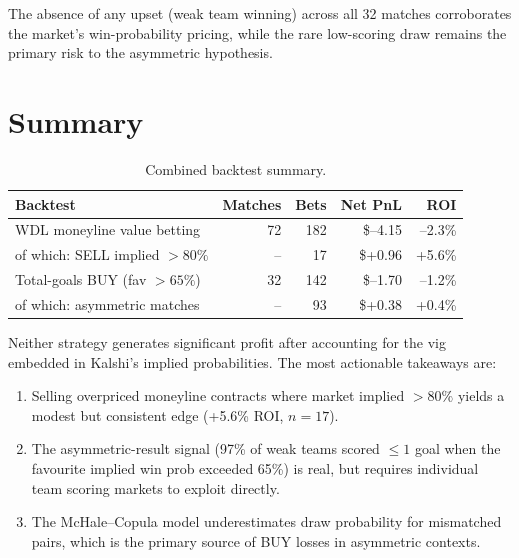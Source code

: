 \documentclass[11pt, a4paper]{article}
\begin{document}
The absence of any upset (weak team winning) across all 32 matches
corroborates the market's win-probability pricing, while the rare
low-scoring draw remains the primary risk to the asymmetric hypothesis.

\bigskip

\section{Summary}

\begin{table}[h!]
\centering
\caption{Combined backtest summary.}
\begin{tabular}{lrrrr}
\toprule
Backtest & Matches & Bets & Net PnL & ROI \\
\midrule
WDL moneyline value betting    & 72 & 182 & \$--4.15 & --2.3\% \\
\quad of which: SELL implied $>80\%$ & -- & 17 & \$+0.96 & +5.6\% \\
Total-goals BUY (fav $>65\%$) & 32 & 142 & \$--1.70 & --1.2\% \\
\quad of which: asymmetric matches & -- & 93 & \$+0.38 & +0.4\% \\
\bottomrule
\end{tabular}
\end{table}

Neither strategy generates significant profit after accounting for the
vig embedded in Kalshi's implied probabilities.
The most actionable takeaways are:
\begin{enumerate}
  \item Selling overpriced moneyline contracts where market implied $> 80\%$
        yields a modest but consistent edge (+5.6\% ROI, $n = 17$).
  \item The asymmetric-result signal (97\% of weak teams scored $\leq 1$
        goal when the favourite implied win prob exceeded 65\%) is real, but
        requires individual team scoring markets to exploit directly.
  \item The McHale--Copula model underestimates draw probability for
        mismatched pairs, which is the primary source of BUY losses in
        asymmetric contexts.
\end{enumerate}
\end{document}
